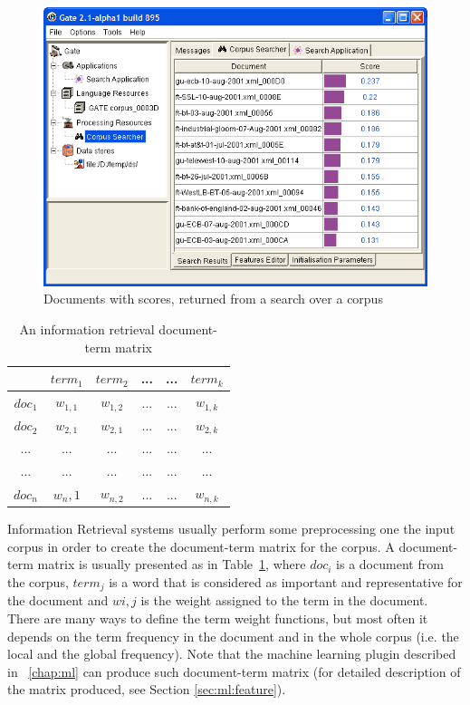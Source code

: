 %
\begin{figure}[htbp]
\begin{center}
\includegraphics[scale=0.5]{ir1.png}
\end{center}
\caption{Documents with scores, returned from a search over a corpus}
\label{fig:ir1}
\end{figure}
%


\begin{table}
\begin{center}
\begin{tabular}{|c|c|c|c|c|c|}
\hline
& $term_1$ & $term_2$ & ... & ... & $term_k$\\
\hline
$doc_1$ & $w_{1,1}$ & $w_{1,2}$ & ... & ... & $w_{1,k}$\\
\hline
$doc_2$ & $w_{2,1}$ & $w_{2,1}$ & ... & ... & $w_{2,k}$\\
\hline
... & ... & ... & ... & ... & ... \\
\hline
... & ... & ... & ... & ... & ... \\
\hline
$doc_n$ & $w{_n,1}$ & $w_{n,2}$ & ... & ... & $w_{n,k}$\\
\hline
\end{tabular}
\caption{An information retrieval document-term matrix}
\label{table:matrix}
\end{center}
\end{table}



Information Retrieval systems usually perform some preprocessing one the input
corpus in order to create the document-term matrix for the corpus. A
document-term matrix is usually presented as in Table~\ref{table:matrix},
where $doc_i$ is a document from the corpus, $term_j$ is a word that is
considered as important and representative for the document and $wi,j$ is the
weight assigned to the term in the document. There are many ways to define the
term weight functions, but most often it depends on the term frequency in the
document and in the whole corpus (i.e. the local and the global
frequency). Note that the machine learning plugin described in
\Chapthing~\ref{chap:ml} can produce such document-term matrix (for detailed
description of the matrix produced, see Section \ref{sec:ml:feature}).

